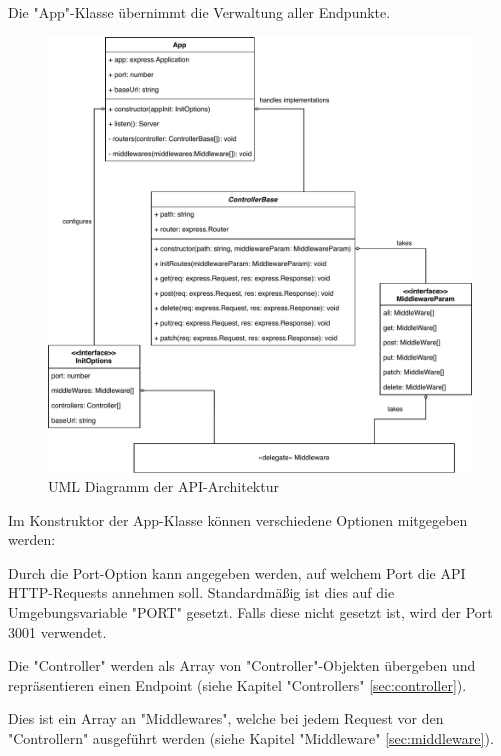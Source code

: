 \label{sec:app}

Die "App"-Klasse übernimmt die Verwaltung aller Endpunkte.  

\begin{figure}[H]
    \centering
    \includegraphics[width=\textwidth]{media/APITemplate/apiArchitecture.svg.pdf}
    \caption{UML Diagramm der API-Architektur}
    \label{fig:apiUML}
\end{figure}

\pagebreak

Im Konstruktor der App-Klasse können verschiedene Optionen mitgegeben werden:


Durch die Port-Option kann angegeben werden, auf welchem Port die API HTTP-Requests annehmen soll. Standardmäßig ist dies auf die Umgebungsvariable "PORT" gesetzt. Falls diese nicht gesetzt ist, wird der Port 3001 verwendet.


Die "Controller" werden als Array von "Controller"-Objekten übergeben und repräsentieren einen Endpoint (siehe Kapitel "Controllers" \ref{sec:controller}).


Dies ist ein Array an "Middlewares", welche bei jedem Request vor den "Controllern" ausgeführt werden (siehe Kapitel "Middleware" \ref{sec:middleware}).

